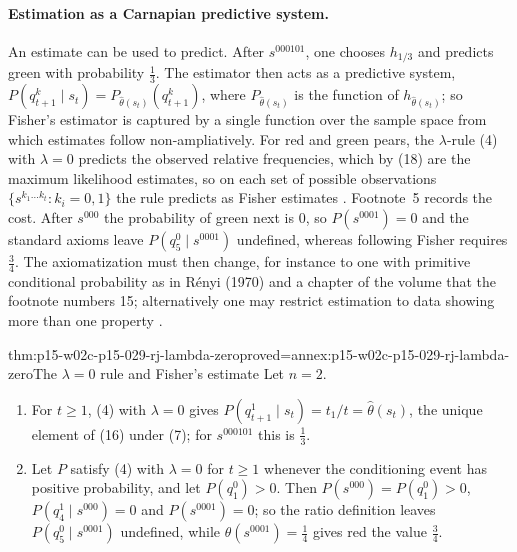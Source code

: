\paragraph{Estimation as a Carnapian predictive system.}
An estimate can be used to predict. After \(s^{000101}\), one chooses
\(h_{1/3}\) and predicts green with probability \(\tfrac13\). The
estimator then acts as a predictive system,
\(P(q^k_{t+1}\mid s_t)=P_{\hat\theta(s_t)}(q^k_{t+1})\), where
\(P_{\hat\theta(s_t)}\) is the function of \(h_{\hat\theta(s_t)}\); so
Fisher's estimator is captured by a single function over the sample
space from which estimates follow non-ampliatively. For red and green
pears, the \(\lambda\)-rule (4) with \(\lambda=0\) predicts the observed
relative frequencies, which by (18) are the maximum likelihood
estimates, so on each set of possible observations
\(\{s^{k_1\ldots k_t}:k_i=0,1\}\) the rule predicts as Fisher estimates
\cite[pp.~644--645]{Romeijn2011InductiveLogicStatistics}. Footnote~5
records the cost. After \(s^{000}\) the probability of green next is
\(0\), so \(P(s^{0001})=0\) and the standard axioms leave
\(P(q^0_5\mid s^{0001})\) undefined, whereas following Fisher requires
\(\tfrac34\). The axiomatization must then change, for instance to one
with primitive conditional probability as in R\'enyi (1970) and a
chapter of the volume that the footnote numbers 15; alternatively one
may restrict estimation to data showing more than one property
\cite[p.~645 n.~5]{Romeijn2011InductiveLogicStatistics}.

\begin{hbtheorem}{thm:p15-w02c-p15-029-rj-lambda-zero}{proved=annex:p15-w02c-p15-029-rj-lambda-zero}{The \texorpdfstring{\(\lambda=0\)}{lambda = 0} rule and Fisher's estimate}
Let \(n=2\).
\begin{enumerate}
\item For \(t\ge1\), (4) with \(\lambda=0\) gives
  \(P(q^1_{t+1}\mid s_t)=t_1/t=\hat\theta(s_t)\), the unique element of
  (16) under (7); for \(s^{000101}\) this is \(\tfrac13\).
\item Let \(P\) satisfy (4) with \(\lambda=0\) for \(t\ge1\) whenever
  the conditioning event has positive probability, and let
  \(P(q^0_1)>0\). Then \(P(s^{000})=P(q^0_1)>0\),
  \(P(q^1_4\mid s^{000})=0\) and \(P(s^{0001})=0\); so the ratio
  definition leaves \(P(q^0_5\mid s^{0001})\) undefined, while
  \(\hat\theta(s^{0001})=\tfrac14\) gives red the value \(\tfrac34\).
\end{enumerate}
\end{hbtheorem}

